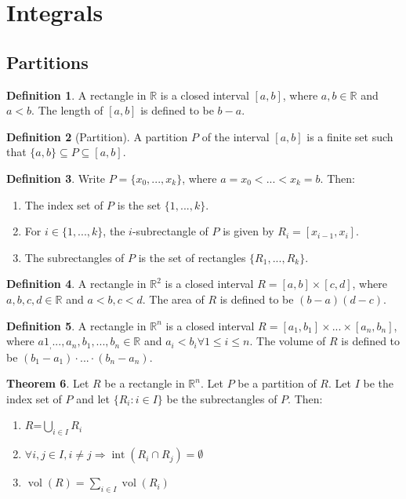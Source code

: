 \documentclass[12pt]{article}
\theoremstyle{definition}
\newtheorem{definition}{Definition}[subsection]
\newtheorem{theorem}[definition]{Theorem}
\theoremstyle{remark}
\begin{document}
\section{Integrals}
\subsection{Partitions}
\begin{definition}
A rectangle in $\mathbb{R}$ is a closed interval $[a,b]$, where $a,b\in\mathbb{R}$ and $a<b.$ The length of $[a,b]$ is defined to be $b-a.$ 
\end{definition}

\begin{definition}[Partition]
A partition $P$ of the interval $[a,b]$ is a finite set such that $\{a,b\}\subseteq P\subseteq [a,b].$
\end{definition}

\begin{definition}
Write $P=\{x_0,...,x_k\}$, where $a=x_0<...<x_k=b$. Then:
\begin{enumerate}[label=(\alph*), nosep]
\item The index set of $P$ is the set $\{1,...,k\}.$
\item For $i\in\{1,...,k\}$, the $i$-subrectangle of $P$ is given by $R_i=[x_{i-1},x_i].$
\item The subrectangles of $P$ is the set of rectangles $\{R_1,...,R_k\}.$
\end{enumerate}
\end{definition}

\begin{definition}
A rectangle in $\mathbb{R}^2$ is a closed interval $R=[a,b]\times [c,d]$, where $a,b,c,d\in\mathbb{R}$ and $a<b,c<d.$ The area of $R$ is defined to be $(b-a)(d-c).$ 
\end{definition}

\begin{definition}
A rectangle in $\mathbb{R}^n$ is a closed interval $R=[a_1,b_1]\times...\times [a_n,b_n]$, where $a1_,...,a_n,b_1,...,b_n\in\mathbb{R}$ and $a_i<b_i\forall1\leq i\leq n.$ The volume of $R$ is defined to be $(b_1-a_1)\cdot...\cdot(b_n-a_n).$ 
\end{definition}

\begin{theorem}
Let $R$ be a rectangle in $\mathbb{R}^n.$ Let $P$ be a partition of $R.$ Let $I$ be the index set of $P$ and let $\{R_i:i\in I\}$ be the subrectangles of $P.$ Then:
\begin{enumerate}[label=(\alph*), nosep]
\item $R$=$\displaystyle\bigcup_{i\in I}R_i$
\item $\forall i,j\in I,i\neq j\Rightarrow \operatorname{int}(R_i\cap R_j)=\emptyset$
\item $\displaystyle \operatorname{vol}(R)=\sum_{i\in I}\operatorname{vol}(R_i)$
\end{enumerate}
\end{theorem}
\end{document}
